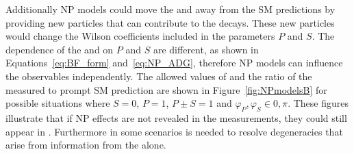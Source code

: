 Additionally NP models could move the \BFs and \ADG away from the SM predictions by providing new particles that can contribute to the decays. These new particles would change the Wilson coefficients included in the parameters $P$ and $S$. The dependence of the \BFs and \ADG on $P$ and $S$ are different, as shown in Equations~\ref{eq:BF_form} and~\ref{eq:NP_ADG}, therefore NP models can influence the observables independently. The allowed values of \ADG and the ratio of the measured \BF to prompt SM prediction are shown in Figure~\ref{fig:NPmodelsB} for possible situations where $S=0$, $P=1$, $P\pm S = 1$ and $\varphi_P, \varphi_S \in {0, \pi}$. These figures illustrate that if NP effects are not revealed in the \BF measurements, they could still appear in \ADG. Furthermore in some scenarios \ADG is needed to resolve degeneracies that arise from information from the \BF alone.
